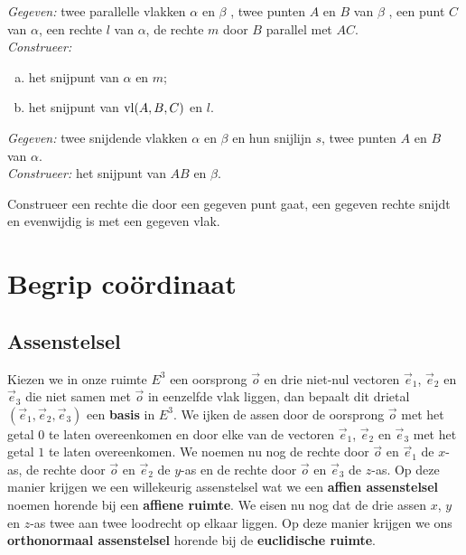 \documentclass[12pt,twoside]{article}
\begin{document}
\begin{oefening}
{\em Gegeven:} twee parallelle vlakken $\alpha$ en $\beta$ , twee punten $A$ en $B$ van $\beta$ , een punt $C$
van $\alpha$, een rechte $l$ van $\alpha$, de rechte $m$ door $B$ parallel met $AC$.\\
{\em Construeer:}
\begin{enumerate}[(a)]
  \item het snijpunt van $\alpha$ en $m$;
  \item het snijpunt van $\vl(A, B, C)$ en $l$.
\end{enumerate}
\end{oefening}

\begin{oefening}
{\em Gegeven:} twee snijdende vlakken $\alpha$ en $\beta$ en hun snijlijn $s$, twee punten $A$ en $B$ van $\alpha$.\\
{\em Construeer:} het snijpunt van $AB$ en $\beta$.
\end{oefening}

\begin{oefening}
Construeer een rechte die door een gegeven punt gaat, een gegeven rechte snijdt en
evenwijdig is met een gegeven vlak.
\end{oefening}



\pagebreak
\section{Begrip coördinaat}

\subsection{Assenstelsel}

Kiezen we in onze ruimte $E^3$ een oorsprong $\vec{o}$ en drie niet-nul vectoren $\vec{e}_1$, $\vec{e}_2$ en $\vec{e}_3$ die niet samen met $\vec{o}$ in eenzelfde vlak liggen, dan bepaalt dit drietal $(\vec{e}_1, \vec{e}_2, \vec{e}_3)$ een {\bf basis} in $E^3$. We ijken de assen door de oorsprong $\vec{o}$ met het getal $0$ te laten overeenkomen en door elke van de vectoren $\vec{e}_1$, $\vec{e}_2$ en $\vec{e}_3$ met het getal $1$ te laten overeenkomen. We noemen nu nog de rechte door $\vec{o}$ en $\vec{e}_1$ de $x$-as, de rechte door $\vec{o}$ en $\vec{e}_2$ de $y$-as en de rechte door $\vec{o}$ en $\vec{e}_3$ de $z$-as. Op deze manier krijgen we een willekeurig assenstelsel wat we een {\bf affien assenstelsel} noemen horende bij een {\bf affiene ruimte}. We eisen nu nog dat de drie assen $x$, $y$ en $z$-as twee aan twee loodrecht op elkaar liggen. Op deze manier krijgen we ons {\bf orthonormaal assenstelsel} horende bij de {\bf euclidische ruimte}.
\end{document}
